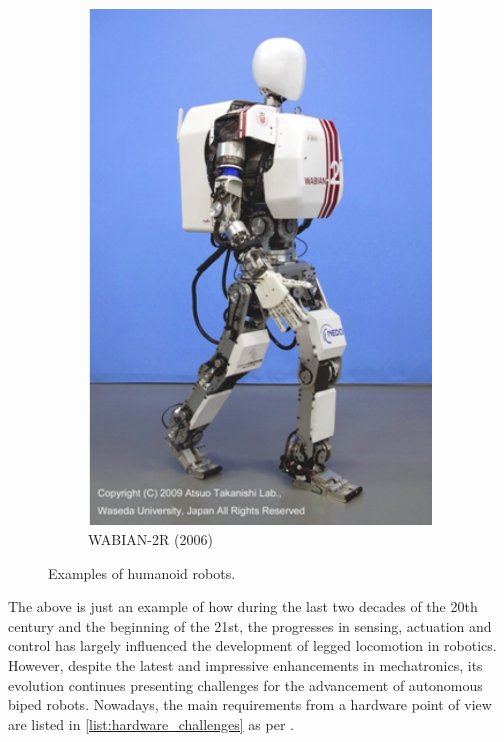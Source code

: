 \begin{figure}[htb]
\begin{subfigure}[t]{0.3\textwidth}
        \includegraphics[width=\textwidth]{figures/waseda2.pdf}
        \caption{WABIAN-2R (2006)}
        \label{fig:waseda_robot2}
    \end{subfigure}
    \caption{Examples of humanoid robots.}
\end{figure}

The above is just an example of how during the last two decades of the 20th century and the beginning of the 21st, the progresses in sensing, actuation and control has largely influenced the development of legged locomotion in robotics.
However, despite the latest and impressive enhancements in mechatronics, its evolution continues presenting challenges for the advancement of autonomous biped robots.
Nowadays, the main requirements from a hardware point of view are listed in \ref{list:hardware_challenges} as per \cite{biped_robots_history}.

